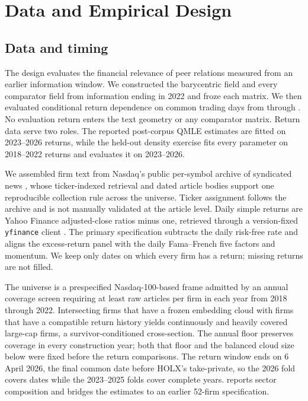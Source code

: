 \section{Data and Empirical Design}
\label{sec:empirical-design}

\subsection{Data and timing}
\label{sec:panel-data}

The design evaluates the financial relevance of peer relations measured from
an earlier information window.
We constructed the barycentric field and every comparator field from
information ending in 2022 and froze each matrix.
We then evaluated conditional return dependence on
 common trading days from
 through
.
No evaluation return enters the text geometry or any comparator matrix.
Return data serve two roles.
The reported post-corpus QMLE estimates are fitted on 2023--2026 returns, while
the held-out density exercise fits every parameter on 2018--2022 returns and
evaluates it on 2023--2026.

We assembled firm text from Nasdaq's public per-symbol archive of syndicated
news \citep{nasdaq_news_headlines_2026}, whose ticker-indexed retrieval and
dated article bodies support one reproducible collection rule across the
universe.
Ticker assignment follows the archive and is not manually validated at the
article level.
Daily simple returns are Yahoo Finance adjusted-close ratios minus one,
retrieved through a version-fixed \texttt{yfinance} client
\citep{yahoo_finance_historical_2026,aroussi_yfinance_2026}.
The primary specification subtracts the daily risk-free rate and aligns the
excess-return panel with the daily Fama--French five factors and momentum.
We keep only dates on which every firm has a return; missing returns are not filled.

The universe is a prespecified Nasdaq-100-based frame admitted by an annual
coverage screen requiring at least  raw
articles per firm in each year from 2018 through 2022.
Intersecting firms that have a frozen embedding cloud with firms that have a
compatible return history yields  continuously and
heavily covered large-cap firms, a survivor-conditioned cross-section.
The annual floor preserves coverage in every construction year; both that
floor and the balanced cloud size below were fixed before the return
comparisons.
The return window ends on 6 April 2026, the final common date before HOLX's
take-private,
so the 2026 fold covers
 dates while the 2023--2025 folds
cover complete years.
 reports sector composition and bridges the
estimates to an earlier 52-firm specification.

